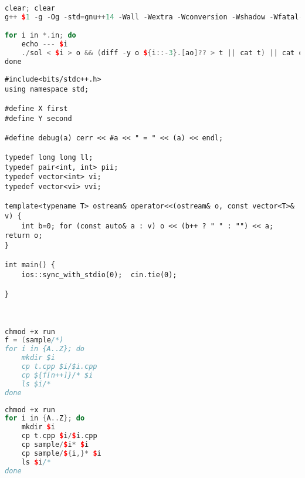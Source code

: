 
{\centering
\begin{lstlisting}[language=c++,frame=tlrb,numbers=none,showstringspaces=false,linewidth=0.487\textwidth,basicstyle=\scriptsize\ttfamily,keywordstyle=\color{geditkeyword}\ttfamily\bfseries,breaklines=true,tabsize=2,aboveskip=4pt,belowskip=4pt,framesep=5pt,linewidth=0.48\textwidth,xleftmargin=0.5em]
clear; clear
g++ $1 -g -Og -std=gnu++14 -Wall -Wextra -Wconversion -Wshadow -Wfatal-errors -fsanitize=address,undefined -o sol || exit

for i in *.in; do
	echo --- $i
	./sol < $i > o && (diff -y o ${i::-3}.[ao]?? > t || cat t) || cat o
done
\end{lstlisting}}

\begin{verbatim}
#include<bits/stdc++.h>
using namespace std;

#define X first
#define Y second

#define debug(a) cerr << #a << " = " << (a) << endl;

typedef long long ll;
typedef pair<int, int> pii;
typedef vector<int> vi;
typedef vector<vi> vvi;

template<typename T> ostream& operator<<(ostream& o, const vector<T>& v) {
	int b=0; for (const auto& a : v) o << (b++ ? " " : "") << a; return o;
}

int main() {
	ios::sync_with_stdio(0);  cin.tie(0);

}
\end{verbatim}

\ \begin{minipage}{0.49\textwidth}
\begin{lstlisting}[language=c++, showstringspaces=false, keywordstyle=\bfseries\color{theWhite}, backgroundcolor=\color{theBlack}, basicstyle=\bfseries\scriptsize\ttfamily\color{theWhite}, morekeywords={chmod, mkdir, cp},numbers=none,frame=single,linewidth=0.47\textwidth,tabsize=2,aboveskip=4pt,belowskip=4pt,framesep=5pt]
chmod +x run
f = (sample/*)
for i in {A..Z}; do
	mkdir $i
	cp t.cpp $i/$i.cpp
	cp ${f[n++]}/* $i
	ls $i/*
done
\end{lstlisting}
\end{minipage} \quad \begin{minipage}{0.49\textwidth}
\begin{lstlisting}[language=c++, showstringspaces=false, keywordstyle=\bfseries\color{theWhite}, backgroundcolor=\color{theBlack}, basicstyle=\bfseries\scriptsize\ttfamily\color{theWhite}, morekeywords={chmod, mkdir, cp},numbers=none,frame=single,linewidth=0.475\textwidth]
chmod +x run
for i in {A..Z}; do
	mkdir $i
	cp t.cpp $i/$i.cpp
	cp sample/$i* $i
	cp sample/${i,}* $i
	ls $i/*
done
\end{lstlisting}
\end{minipage}
